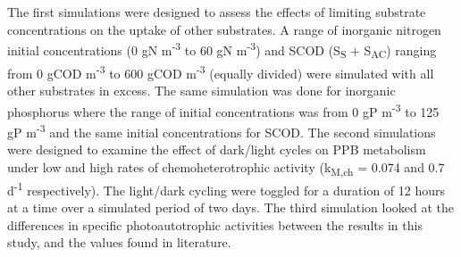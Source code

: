 \skippingparagraph
The first simulations were designed to assess the effects of limiting substrate concentrations on the uptake of other substrates. 
A range of inorganic nitrogen initial concentrations (0 gN m\textsuperscript{-3} to 60 gN m\textsuperscript{-3}) and SCOD (S\textsubscript{S} + S\textsubscript{AC}) ranging from 0 gCOD m\textsuperscript{-3} to 600 gCOD m\textsuperscript{-3} (equally divided) were simulated with all other substrates in excess. The same simulation was done for inorganic phosphorus where the range of initial concentrations was from 0 gP m\textsuperscript{-3} to 125 gP m\textsuperscript{-3} and the same initial concentrations for SCOD. 
\skippingparagraph
The second simulations were designed to examine the effect of dark/light cycles on PPB metabolism under low and high rates of chemoheterotrophic activity (k\textsubscript{M,ch} = 0.074 and 0.7 d\textsuperscript{-1} respectively). The light/dark cycling were toggled for a duration of 12 hours at a time over a simulated period of two days. 
\skippingparagraph
The third simulation looked at the differences in specific photoautotrophic activities between the results in this study, and the values found in literature.



